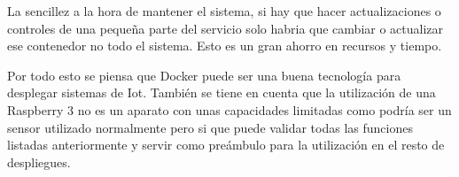 La sencillez a la hora de mantener el sistema, si hay que hacer actualizaciones o controles de una pequeña parte del servicio solo habria que cambiar o actualizar ese contenedor no todo el sistema. Esto es un gran ahorro en recursos y tiempo. 

Por todo esto se piensa que Docker puede ser una buena tecnología para desplegar sistemas de Iot. También se tiene en cuenta que la utilización de una Raspberry 3 no es un aparato con unas capacidades limitadas como podría ser un sensor utilizado normalmente pero si que puede validar todas las funciones listadas anteriormente y servir como preámbulo para la utilización en el resto de despliegues.  

